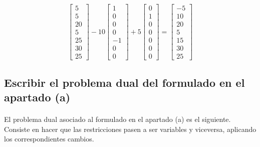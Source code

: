 \documentclass[10pt, a4paper]{article}
\begin{document}
			\[
			\begin{bmatrix}
				5 \\
				5 \\
				20 \\
				5 \\
				25 \\
				30 \\
				25
			\end{bmatrix}
			-10
			\begin{bmatrix}
				1 \\
				0 \\
				0 \\
				0 \\
				-1 \\
				0 \\
				0
			\end{bmatrix}
			+5
			\begin{bmatrix}
				0 \\
				1 \\
				0 \\
				0 \\
				0 \\
				0 \\
				0
			\end{bmatrix}
			=
			\begin{bmatrix}
				-5 \\
				10 \\
				20 \\
				5 \\
				15 \\
				30 \\
				25
			\end{bmatrix}
			\]

		\subsection{Escribir el problema dual del formulado en el apartado (a)}

			\paragraph{}
			El problema dual asociado al formulado en el apartado (a) es el siguiente. Consiste en hacer que las restricciones pasen a ser variables y viceversa, aplicando los correspondientes cambios.
\end{document}
